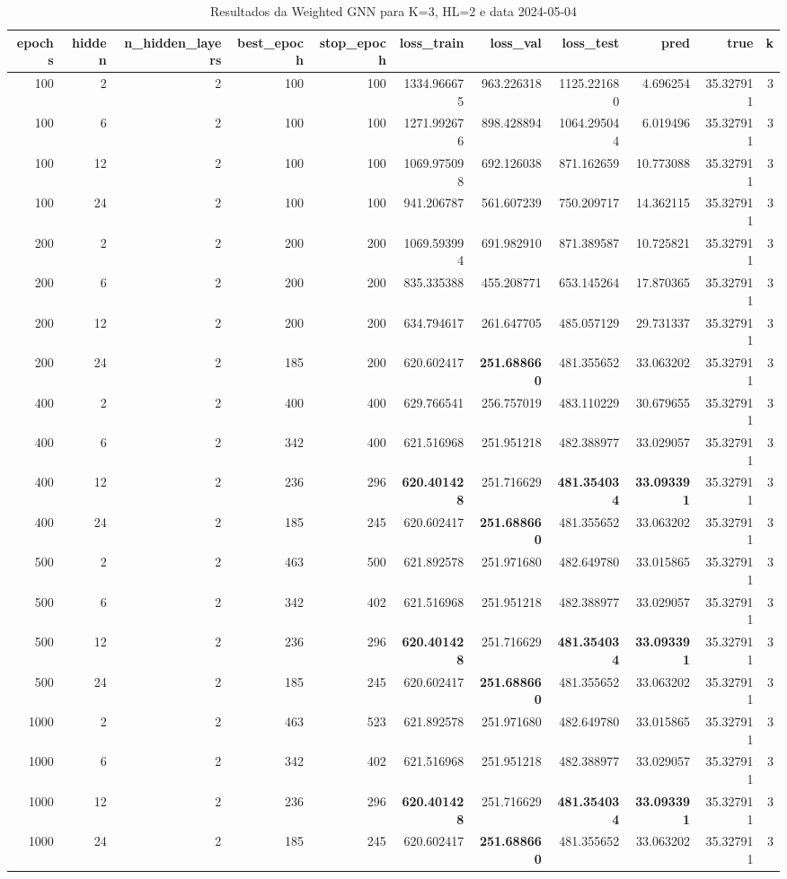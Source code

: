 \begin{table}
\caption{Resultados da Weighted GNN para K=3, HL=2 e data 2024-05-04}
\label{tab:weighted_gnn_results_k3_hl2_d20240504}
\begin{tabular}{rrrrrrrrrrr}
\toprule
epochs & hidden & n\_hidden\_layers & best\_epoch & stop\_epoch & loss\_train & loss\_val & loss\_test & pred & true & k \\
\midrule
100 & 2 & 2 & 100 & 100 & 1334.966675 & 963.226318 & 1125.221680 & 4.696254 & 35.327911 & 3 \\
100 & 6 & 2 & 100 & 100 & 1271.992676 & 898.428894 & 1064.295044 & 6.019496 & 35.327911 & 3 \\
100 & 12 & 2 & 100 & 100 & 1069.975098 & 692.126038 & 871.162659 & 10.773088 & 35.327911 & 3 \\
100 & 24 & 2 & 100 & 100 & 941.206787 & 561.607239 & 750.209717 & 14.362115 & 35.327911 & 3 \\
200 & 2 & 2 & 200 & 200 & 1069.593994 & 691.982910 & 871.389587 & 10.725821 & 35.327911 & 3 \\
200 & 6 & 2 & 200 & 200 & 835.335388 & 455.208771 & 653.145264 & 17.870365 & 35.327911 & 3 \\
200 & 12 & 2 & 200 & 200 & 634.794617 & 261.647705 & 485.057129 & 29.731337 & 35.327911 & 3 \\
200 & 24 & 2 & 185 & 200 & 620.602417 & \textbf{251.688660} & 481.355652 & 33.063202 & 35.327911 & 3 \\
400 & 2 & 2 & 400 & 400 & 629.766541 & 256.757019 & 483.110229 & 30.679655 & 35.327911 & 3 \\
400 & 6 & 2 & 342 & 400 & 621.516968 & 251.951218 & 482.388977 & 33.029057 & 35.327911 & 3 \\
400 & 12 & 2 & 236 & 296 & \textbf{620.401428} & 251.716629 & \textbf{481.354034} & \textbf{33.093391} & 35.327911 & 3 \\
400 & 24 & 2 & 185 & 245 & 620.602417 & \textbf{251.688660} & 481.355652 & 33.063202 & 35.327911 & 3 \\
500 & 2 & 2 & 463 & 500 & 621.892578 & 251.971680 & 482.649780 & 33.015865 & 35.327911 & 3 \\
500 & 6 & 2 & 342 & 402 & 621.516968 & 251.951218 & 482.388977 & 33.029057 & 35.327911 & 3 \\
500 & 12 & 2 & 236 & 296 & \textbf{620.401428} & 251.716629 & \textbf{481.354034} & \textbf{33.093391} & 35.327911 & 3 \\
500 & 24 & 2 & 185 & 245 & 620.602417 & \textbf{251.688660} & 481.355652 & 33.063202 & 35.327911 & 3 \\
1000 & 2 & 2 & 463 & 523 & 621.892578 & 251.971680 & 482.649780 & 33.015865 & 35.327911 & 3 \\
1000 & 6 & 2 & 342 & 402 & 621.516968 & 251.951218 & 482.388977 & 33.029057 & 35.327911 & 3 \\
1000 & 12 & 2 & 236 & 296 & \textbf{620.401428} & 251.716629 & \textbf{481.354034} & \textbf{33.093391} & 35.327911 & 3 \\
1000 & 24 & 2 & 185 & 245 & 620.602417 & \textbf{251.688660} & 481.355652 & 33.063202 & 35.327911 & 3 \\
\bottomrule
\end{tabular}
\end{table}

